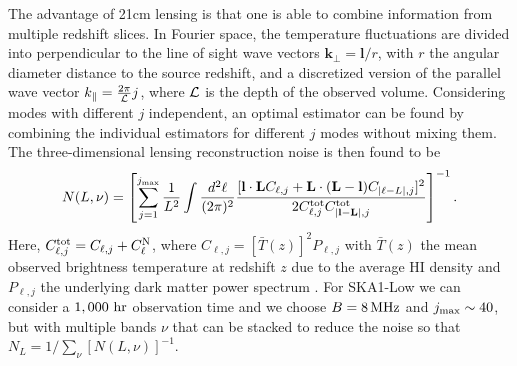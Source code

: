 \documentclass{PoS}
\begin{document}
The advantage of 21cm lensing is that one is able to combine
information from multiple redshift slices. In Fourier space, the
temperature fluctuations are divided into perpendicular to the line of
sight wave vectors $\mathbf{k_\perp}=\mathbf{l}/r$, with $r$ the angular diameter distance to the source redshift, and a
discretized version of the parallel wave vector $k_\parallel =
\frac{2\pi}{{\cal L}}j$, where ${\cal L}$ is the depth of the observed
volume. Considering modes with different $j$ independent, an optimal
estimator can be found by combining the individual estimators for
different $j$ modes without mixing them. The three-dimensional lensing reconstruction noise is then found to be  \citep{Zahn:2005ap}\begin{equation}
N(L,\nu) =  \left[\sum_{j=1}^{j_{\rm max}} \frac{1}{L^2}\int \frac{d^2\ell}{(2\pi)^2}  \frac{[\mathbf{l} \cdot \mathbf{L} C_{\ell,j}+\mathbf{L} \cdot (\mathbf{L}-\mathbf{l})
C_{|\ell-L|,j}]^2}{2 C^{\rm tot}_{\ell,j}C^{\rm tot}_{|\mathbf{l}-\mathbf{L}|,j}}\right]^{-1}.
\end{equation}
Here, $C^{\rm tot}_{\ell,j}=C_{\ell,j}+C^{\rm N}_\ell$, where $C_{\ell,j}=[\bar{T}(z)]^2P_{\ell,j}$ with $\bar{T}(z)$ the mean observed brightness temperature at redshift $z$ due to the average HI density and $P_{\ell,j}$ the underlying dark matter power spectrum  \citep{Zahn:2005ap}. 
For SKA1-Low we can consider a $1,000~{\rm hr}$ observation time and we choose $B = 8 \, {\rm MHz}$ and $j_{\rm max} \sim 40$, but with multiple bands $\nu$ that can be stacked to reduce the noise so that $N_L = 1/\displaystyle\sum_{\nu} [N(L,\nu)]^{-1}$. 
 
\end{document}
